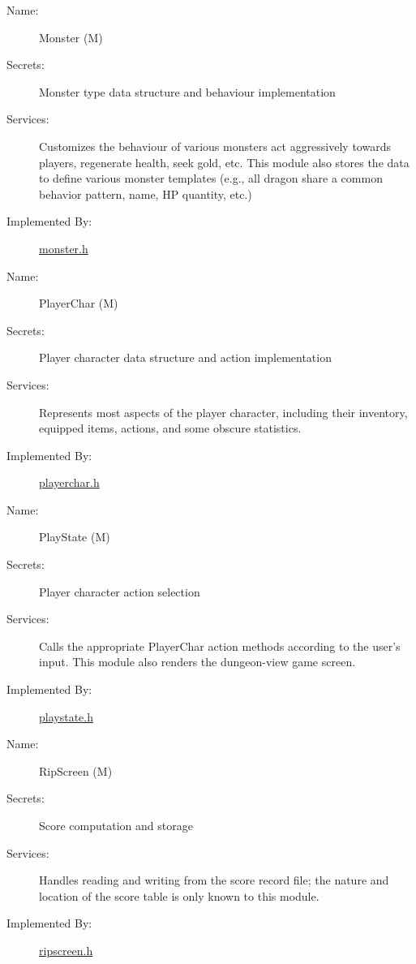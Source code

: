 \documentclass[12pt, titlepage]{article}
\newcounter{mnum}
\newcommand{\mdprint}[1]{\addtocounter{mnum}{1} #1 (M\themnum)}
\begin{document}
        \bigskip\begin{description}
            \item[Name:]\mdprint{Monster}
            \item[Secrets:]Monster type data structure and behaviour implementation
            \item[Services:]Customizes the behaviour of various monsters act aggressively towards players, regenerate health, seek gold, etc.  This module also stores the data to define various monster templates (e.g., all dragon share a common behavior pattern, name, HP quantity, etc.)
            \item[Implemented By:]\href{run:../../../src/include/monster.h}{monster.h}
        \end{description}

        \bigskip\begin{description}
            \item[Name:]\mdprint{PlayerChar}
            \item[Secrets:]Player character data structure and action implementation
            \item[Services:]Represents most aspects of the player character, including their inventory, equipped items, actions, and some obscure statistics.
            \item[Implemented By:]\href{run:../../../src/include/playerchar.h}{playerchar.h}
        \end{description}

        \bigskip\begin{description}
            \item[Name:]\mdprint{PlayState}
            \item[Secrets:]Player character action selection
            \item[Services:]Calls the appropriate PlayerChar action methods according to the user's input.  This module also renders the dungeon-view game screen.
            \item[Implemented By:]\href{run:../../../src/include/playstate.h}{playstate.h}
        \end{description}

        \bigskip\begin{description}
            \item[Name:]\mdprint{RipScreen}
            \item[Secrets:]Score computation and storage
            \item[Services:]Handles reading and writing from the score record file; the nature and location of the score table is only known to this module.
            \item[Implemented By:]\href{run:../../../src/include/ripscreen.h}{ripscreen.h}
        \end{description}
\end{document}
